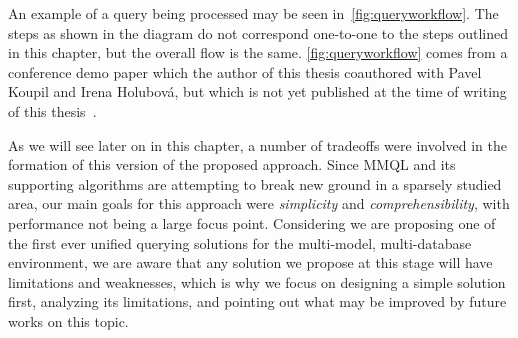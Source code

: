 An example of a query being processed may be seen in~\cref{fig:queryworkflow}. The steps as shown in the diagram do not correspond one-to-one to the steps outlined in this chapter, but the overall flow is the same.
\cref{fig:queryworkflow} comes from a conference demo paper which the author of this thesis coauthored  with Pavel Koupil and Irena Holubov{\'a}, but which is not yet published at the time of writing of this thesis~\cite{mm_quecat}.

As we will see later on in this chapter, a number of tradeoffs were involved in the formation of this version of the proposed approach.
Since MMQL and its supporting algorithms are attempting to break new ground in a sparsely studied area, our main goals for this approach were \textit{simplicity} and \textit{comprehensibility}, with performance not being a large focus point.
Considering we are proposing one of the first ever unified querying solutions for the multi-model, multi-database environment, we are aware that any solution we propose at this stage will have limitations and weaknesses, which is why we focus on designing a simple solution first, analyzing its limitations, and pointing out what may be improved by future works on this topic.

